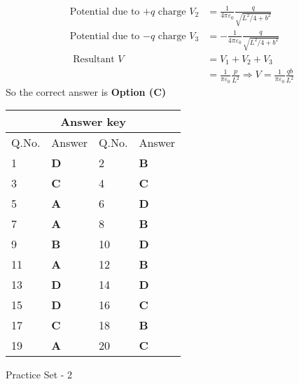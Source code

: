 \begin{enumerate}
\begin{answer}
\begin{align*}
		\text{Potential due to $+q$ charge }V_{2}&=\frac{1}{4 \pi \varepsilon_{0}} \frac{q}{\sqrt{L^{2} / 4+b^{2}}}\\
		\text{Potential due to $-q$ charge }V_{3}&=-\frac{1}{4 \pi \varepsilon_{0}} \frac{q}{\sqrt{L^{2} / 4+b^{2}}}\\
		\text{	Resultant }V&=V_{1}+V_{2}+V_{3}\\&=\frac{1}{\pi \varepsilon_{0}} \frac{p}{L^{2}} \Rightarrow V=\frac{1}{\pi \varepsilon_{0}} \frac{q b}{L^{2}}
		\end{align*}
		So the correct answer is \textbf{Option (C)}
	\end{answer}
	
	
	
\end{enumerate}
\setlength\arrayrulewidth{1pt}
\begin{table}[H]
	\centering
	\begin{tabular}{|p{1.5cm}|p{1.5cm}||p{1.5cm}|p{1.5cm}|}
		\hline
		\multicolumn{4}{|c|}{\textbf{Answer key}}\\\hline\hline
		\rowcolor{ocrel}Q.No.&Answer&Q.No.&Answer\\\hline
		1&\textbf{D} &2&\textbf{B}\\\hline 
		3&\textbf{C} &4&\textbf{C} \\\hline
		5&\textbf{A} &6&\textbf{D} \\\hline
		7&\textbf{A}&8&\textbf{B}\\\hline
		9&\textbf{B}&10&\textbf{D}\\\hline
		11&\textbf{A} &12&\textbf{B}\\\hline
		13&\textbf{D}&14&\textbf{D}\\\hline
		15&\textbf{D}&16&\textbf{C}\\\hline
		17&\textbf{C} &18&\textbf{B}\\\hline 
		19&\textbf{A} &20&\textbf{C} \\\hline
	\end{tabular}
\end{table}
\begin{abox}
	Practice Set - 2
\end{abox}
